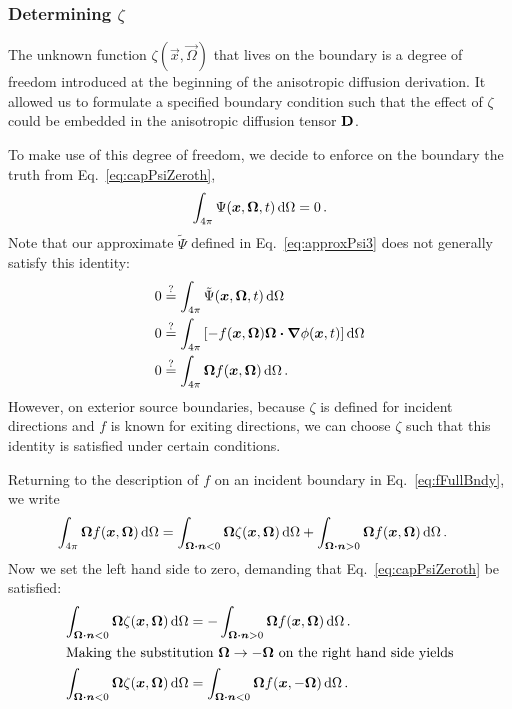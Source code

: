 \subsubsection{Determining $\zeta$}\label{sec:determiningZeta}
The unknown function $\zeta(\vec{x}, \vec{\Omega})$ that lives on the boundary
is a degree of freedom introduced at the beginning of the anisotropic
diffusion derivation. It allowed us to formulate a specified boundary condition
such that the effect of $\zeta$ could be embedded in the anisotropic diffusion
tensor $\mathbf{D}$.

To make use of this degree of freedom, we decide to enforce on the boundary the
truth from Eq.~\eqref{eq:capPsiZeroth},
\begin{equation*}
  \int_{4\pi} \Psi(\bm{x}, \bm{\Omega}, t) \mathop{}\!\mathrm{d}\Omega
  = 0 \,.
\end{equation*}
Note that our approximate $\tilde\Psi$ defined in Eq.~\eqref{eq:approxPsi3}
does not generally satisfy this identity:
\begin{align*}
  0
&\stackrel{\mathrm{?}}{=} \int_{4\pi} \tilde\Psi(\bm{x}, \bm{\Omega}, t) \mathop{}\!\mathrm{d}\Omega
\\
0 &\stackrel{\mathrm{?}}{=} \int_{4\pi} \left[ - f(\bm{x}, \bm{\Omega}) \bm{\Omega}
\bm{\cdot} \bm{\nabla} \phi(\bm{x}, t)\right]
\mathop{}\!\mathrm{d}\Omega
\\
0 &\stackrel{\mathrm{?}}{=} \int_{4\pi} \bm{\Omega} f(\bm{x}, \bm{\Omega})\mathop{}\!\mathrm{d}\Omega \,.
\end{align*}
However, on exterior source boundaries, because $\zeta$ is defined for incident
directions and $f$ is known for exiting directions, we can choose $\zeta$ such
that this identity is satisfied under certain conditions.

Returning to the description of $f$ on an incident boundary in
Eq.~\eqref{eq:fFullBndy}, we write
\begin{align*}
  \int_{4\pi} \bm{\Omega} f(\bm{x}, \bm{\Omega})\mathop{}\!\mathrm{d}\Omega
  &= \int_{\bm{\Omega} \bm{\cdot} \bm{n} < 0}
  \bm{\Omega} \zeta(\bm{x}, \bm{\Omega})\mathop{}\!\mathrm{d}\Omega
  + \int_{\bm{\Omega} \bm{\cdot} \bm{n} > 0}
  \bm{\Omega} f(\bm{x}, \bm{\Omega})\mathop{}\!\mathrm{d}\Omega\,.
\end{align*}
Now we set the left hand side to zero, demanding that
Eq.~\eqref{eq:capPsiZeroth} be satisfied:
\begin{align} \nonumber
  \int_{\bm{\Omega} \bm{\cdot} \bm{n} < 0}
  \bm{\Omega} \zeta(\bm{x}, \bm{\Omega})\mathop{}\!\mathrm{d}\Omega
  &= -\int_{\bm{\Omega} \bm{\cdot} \bm{n} > 0}
  \bm{\Omega} f(\bm{x}, \bm{\Omega})\mathop{}\!\mathrm{d}\Omega \,.
  \\ 
  \intertext{Making the substitution $\bm{\Omega}\to -\bm{\Omega}$ on the
  right hand side yields}
  \label{eq:zetaCondition}
  \int_{\bm{\Omega} \bm{\cdot} \bm{n} < 0}
  \bm{\Omega} \zeta(\bm{x}, \bm{\Omega})\mathop{}\!\mathrm{d}\Omega
  &= \int_{\bm{\Omega} \bm{\cdot} \bm{n} < 0}
  \bm{\Omega} f(\bm{x}, -\bm{\Omega})\mathop{}\!\mathrm{d}\Omega \,.
\end{align}

